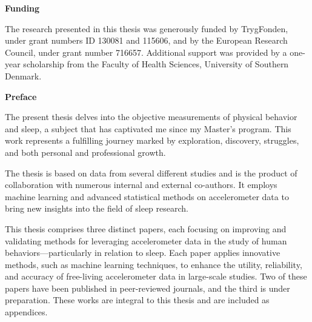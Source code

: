 \vspace{2cm}

\textcolor{color1}{\textsf{\textbf{\Large{Funding}}}}

\vspace*{\baselineskip}

The research presented in this thesis was generously funded by TrygFonden, under grant numbers ID 130081 and 115606, and by the European Research Council, under grant number 716657. Additional support was provided by a one-year scholarship from the Faculty of Health Sciences, University of Southern Denmark.

\newpage

  
\textcolor{color1}{\textsf{\textbf{\Large{Preface}}}}

\vspace*{\baselineskip}

The present thesis delves into the objective measurements of physical behavior and sleep, a subject that has captivated me since my Master's program. This work represents a fulfilling journey marked by exploration, discovery, struggles, and both personal and professional growth.

The thesis is based on data from several different studies and is the product of collaboration with numerous internal and external co-authors. It employs machine learning and advanced statistical methods on accelerometer data to bring new insights into the field of sleep research.

This thesis comprises three distinct papers, each focusing on improving and validating methods for leveraging accelerometer data in the study of human behaviors—particularly in relation to sleep. Each paper applies innovative methods, such as machine learning techniques, to enhance the utility, reliability, and accuracy of free-living accelerometer data in large-scale studies. Two of these papers have been published in peer-reviewed journals, and the third is under preparation. These works are integral to this thesis and are included as appendices.

